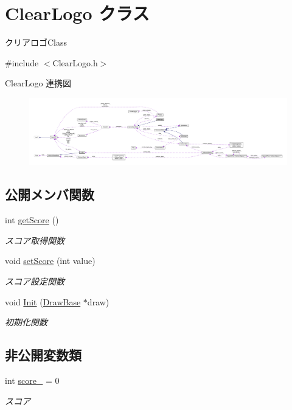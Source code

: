 \hypertarget{class_clear_logo}{}\section{Clear\+Logo クラス}
\label{class_clear_logo}


クリアロゴ\+Class  




{\ttfamily \#include $<$Clear\+Logo.\+h$>$}



Clear\+Logo 連携図\nopagebreak
\begin{figure}[H]
\begin{center}
\leavevmode
\includegraphics[width=350pt]{class_clear_logo__coll__graph}
\end{center}
\end{figure}
\subsection*{公開メンバ関数}
\begin{DoxyCompactItemize}
\item 
int \mbox{\hyperlink{class_clear_logo_ab19c1b71853014f6a037db63e1a052d4}{get\+Score}} ()
\begin{DoxyCompactList}\small\item\em スコア取得関数 \end{DoxyCompactList}\item 
void \mbox{\hyperlink{class_clear_logo_a6c4fd6460e479d7b9c970fd775735807}{set\+Score}} (int value)
\begin{DoxyCompactList}\small\item\em スコア設定関数 \end{DoxyCompactList}\item 
void \mbox{\hyperlink{class_clear_logo_a46c1a948342d75bb418047a31e70999d}{Init}} (\mbox{\hyperlink{class_draw_base}{Draw\+Base}} $\ast$draw)
\begin{DoxyCompactList}\small\item\em 初期化関数 \end{DoxyCompactList}\end{DoxyCompactItemize}
\subsection*{非公開変数類}
\begin{DoxyCompactItemize}
\item 
int \mbox{\hyperlink{class_clear_logo_ab56bfb1e5656143da26cd4c841b67e5f}{score\+\_\+}} = 0
\begin{DoxyCompactList}\small\item\em スコア \end{DoxyCompactList}\end{DoxyCompactItemize}
